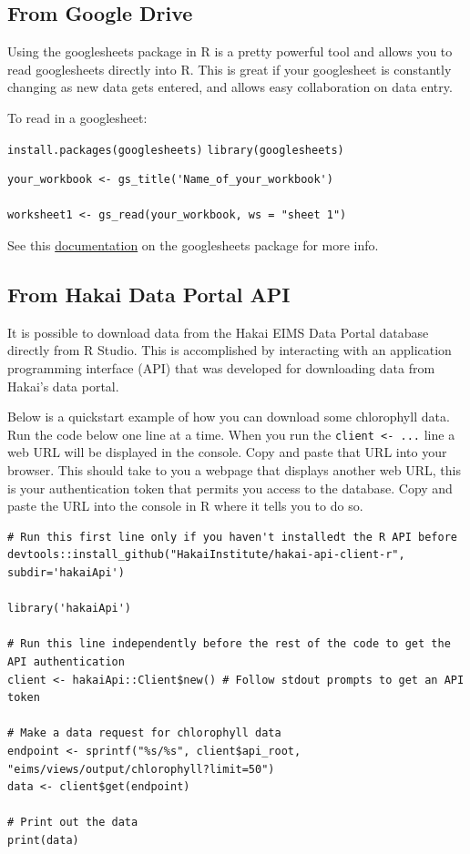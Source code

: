 \documentclass[]{book}
\begin{document}
\subsection{From Google Drive}\label{from-google-drive}

Using the googlesheets package in R is a pretty powerful tool and allows
you to read googlesheets directly into R. This is great if your
googlesheet is constantly changing as new data gets entered, and allows
easy collaboration on data entry.

To read in a googlesheet:

\texttt{install.packages(\textquotesingle{}googlesheets\textquotesingle{})}
\texttt{library(googlesheets)}

\begin{verbatim}
your_workbook <- gs_title('Name_of_your_workbook')

worksheet1 <- gs_read(your_workbook, ws = "sheet 1")
\end{verbatim}

See this
\href{https://cran.r-project.org/web/packages/googlesheets/vignettes/basic-usage.html}{documentation}
on the googlesheets package for more info.

\subsection{From Hakai Data Portal
API}\label{from-hakai-data-portal-api}

It is possible to download data from the Hakai EIMS Data Portal database
directly from R Studio. This is accomplished by interacting with an
application programming interface (API) that was developed for
downloading data from Hakai's data portal.

Below is a quickstart example of how you can download some chlorophyll
data. Run the code below one line at a time. When you run the
\texttt{client\ \textless{}-\ ...} line a web URL will be displayed in
the console. Copy and paste that URL into your browser. This should take
to you a webpage that displays another web URL, this is your
authentication token that permits you access to the database. Copy and
paste the URL into the console in R where it tells you to do so.

\begin{verbatim}
# Run this first line only if you haven't installedt the R API before
devtools::install_github("HakaiInstitute/hakai-api-client-r", subdir='hakaiApi')

library('hakaiApi')

# Run this line independently before the rest of the code to get the API authentication
client <- hakaiApi::Client$new() # Follow stdout prompts to get an API token

# Make a data request for chlorophyll data
endpoint <- sprintf("%s/%s", client$api_root, "eims/views/output/chlorophyll?limit=50")
data <- client$get(endpoint)

# Print out the data
print(data)
\end{verbatim}
\end{document}
